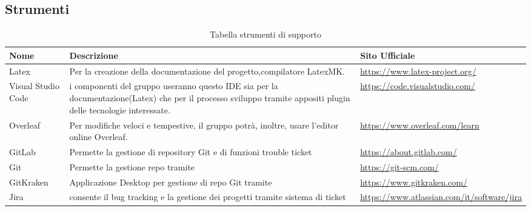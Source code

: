 \newpage
\subsection{Strumenti}
\hypertarget{ProcessiSupporto}{}
\begin{longtable}{ C{2cm} C{5.5cm} C{4cm}  }
    \caption{Tabella strumenti di supporto}\\
    \rowcolor{\primaryColor}
    \textcolor{\secondaryColor}{\textbf{Nome}} & \textcolor{\secondaryColor}{\textbf{Descrizione}} & \textcolor{\secondaryColor}{\textbf{Sito Ufficiale}}\\ \endhead
    {Latex} & {Per la creazione della documentazione del progetto,compilatore LatexMK.} & {\url{https://www.latex-project.org/}}\\
    {Visual Studio Code} & {i componenti del gruppo useranno questo IDE sia per la documentazione(Latex) che per il processo sviluppo tramite appositi plugin delle tecnologie interessate.} & {\url{https://code.visualstudio.com/}}\\
    {Overleaf} & {Per modifiche veloci e tempestive, il gruppo potrà, inoltre, usare l'editor online Overleaf.} & {\url{https://www.overleaf.com/learn}}\\
    {GitLab} & {Permette la gestione di repository Git e di funzioni trouble ticket } & {\url{https://about.gitlab.com/}}\\
    {Git}  & {Permette la gestione repo tramite  } & {\url{https://git-scm.com/}}\\
    {GitKraken}  & {Applicazione Desktop per gestione di repo Git tramite } & {\url{https://www.gitkraken.com/}}\\
    {Jira} & { consente il bug tracking e la gestione dei progetti  tramite sistema di ticket} & {\url{https://www.atlassian.com/it/software/jira}}\\
\end{longtable} 

